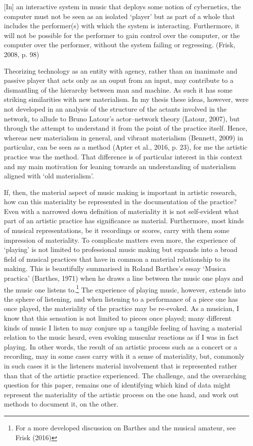 {[}In{]} an interactive system in music that deploys some notion of
cybernetics, the computer must not be seen as an isolated `player' but
as part of a whole that includes the performer(s) with which the system
is interacting. Furthermore, it will not be possible for the performer
to gain control over the computer, or the computer over the performer,
without the system failing or regressing. (Frisk, 2008, p. 98)

Theorizing technology as an entity with agency, rather than an inanimate
and passive player that acts only as an ouput from an input, may
contribute to a dismantling of the hierarchy between man and machine. As
such it has some striking similarities with new materialism. In my
thesis these ideas, however, were not developed in an analysis of the
structure of the actants involved in the network, to allude to Bruno
Latour's actor--network theory (Latour, 2007), but through the attempt
to understand it from the point of the practice itself. Hence, whereas
new materialism in general, and vibrant materialism (Bennett, 2009) in
particular, can be seen as a method (Apter et al., 2016, p. 23), for me
the artistic practice was the method. That difference is of particular
interest in this context and my main motivation for leaning towards an
understanding of materialism aligned with `old materialism'.

If, then, the material aspect of music making is important in artistic
research, how can this materiality be represented in the documentation
of the practice? Even with a narrowed down definition of materiality it
is not self-evident what part of an artistic practice has significance
as material. Furthermore, most kinds of musical representations, be it
recordings or scores, carry with them some impression of materiality. To
complicate matters even more, the experience of `playing' is not limited
to professional music making but expands into a broad field of musical
practices that have in common a material relationship to its making.
This is beautifully summarised in Roland Barthes's essay `Musica
practica' (Barthes, 1971) when he draws a line between the music one
plays and the music one listens to.\footnote{For a more developed
  discussion on Barthes and the musical amateur, see Frisk (2016)} { }
The experience of playing music, however, extends into the sphere of
listening, and when listening to a performance of a piece one has once
played, the materiality of the practice may be re-evoked. As a musician,
I know that this sensation is not limited to pieces once played; many
different kinds of music I listen to may conjure up a tangible feeling
of having a material relation to the music heard, even evoking muscular
reactions as if I was in fact playing. In other words, the result of an
artistic process such as a concert or a recording, may in some cases
carry with it a sense of materiality, but, commonly in such cases it is
the listeners material involvement that is represented rather than that
of the artistic practice experienced. The challenge, and the overarching
question for this paper, remains one of identifying which kind of data
might represent the materiality of the artistic process on the one hand,
and work out methods to document it, on the other.

